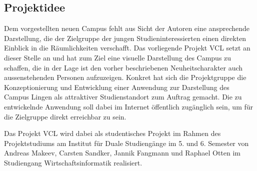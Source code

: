 \subsection{Projektidee}
\label{sec:Projektidee}

Dem vorgestellten neuen Campus fehlt aus Sicht der Autoren eine ansprechende Darstellung,
die der Zielgruppe der jungen Studieninteressierten einen direkten Einblick in die
Räumlichkeiten verschafft. Das vorliegende Projekt \acs{VCL} setzt an dieser Stelle an und hat zum Ziel
eine visuelle Darstellung des Campus zu schaffen, die in der Lage ist den vorher beschriebenen Neuheitscharakter
auch aussenstehenden Personen aufzuzeigen. Konkret hat sich die Projektgruppe
die Konzeptionierung und Entwicklung einer Anwendung zur Darstellung
des Campus Lingen als attraktiver Studienstandort zum Auftrag gemacht.
Die zu entwickelnde Anwendung soll dabei im Internet öffentlich zugänglich sein, um
für die Zielgruppe direkt erreichbar zu sein.

Das Projekt VCL wird dabei als studentisches Projekt im Rahmen des Projektstudiums am Institut für
Duale Studiengänge im 5. und 6. Semester von Andreas Makeev, Carsten Sandker, Jannik Fangmann
und Raphael Otten im Studiengang Wirtschaftsinformatik realisiert.
